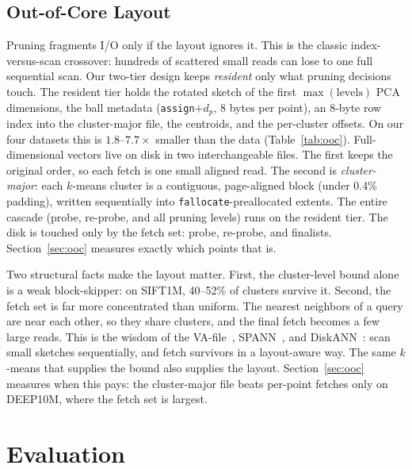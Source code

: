 \documentclass[sigconf, nonacm]{acmart}
\begin{document}
\subsection{Out-of-Core Layout}
\label{sec:layout}

Pruning fragments I/O only if the layout ignores it. This is the classic
index-versus-scan crossover: hundreds of scattered small reads can lose
to one full sequential scan. Our two-tier design keeps \emph{resident}
only what pruning decisions touch. The resident tier holds the rotated
sketch of the first $\max(\mathrm{levels})$ PCA dimensions, the ball
metadata (\texttt{assign}${+}d_p$, 8 bytes per point), an 8-byte row
index into the cluster-major file, the centroids, and the per-cluster
offsets. On our four datasets this is $1.8$--$7.7\times$ smaller than the
data (Table~\ref{tab:ooc}). Full-dimensional vectors live on disk in two interchangeable files.
The first keeps the original order, so each fetch is one small aligned
read. The second is \emph{cluster-major}: each $k$-means cluster is a
contiguous, page-aligned block (under 0.4\% padding), written
sequentially into \texttt{fallocate}-preallocated extents. The entire
cascade (probe, re-probe, and all pruning levels) runs on the resident
tier. The disk is touched only by the fetch set: probe, re-probe, and
finalists. Section~\ref{sec:ooc} measures exactly which points that is.

Two structural facts make the layout matter. First, the cluster-level
bound alone is a weak block-skipper: on SIFT1M, 40--52\% of clusters
survive it. Second, the fetch set is far more concentrated than uniform.
The nearest neighbors of a query are near each other, so they share
clusters, and the final fetch becomes a few large reads. This is the
wisdom of the VA-file~\cite{vafile}, SPANN~\cite{spann}, and
DiskANN~\cite{diskann}: scan small sketches sequentially, and fetch
survivors in a layout-aware way. The same $k$-means that supplies the
bound also supplies the layout. Section~\ref{sec:ooc} measures when this
pays: the cluster-major file beats per-point fetches only on DEEP10M,
where the fetch set is largest.

\section{Evaluation}
\label{sec:eval}
\end{document}
